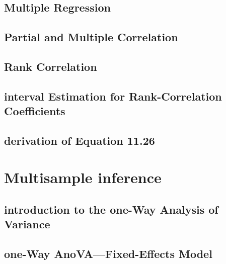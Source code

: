 \documentclass[12pt,]{article}
\begin{document}
\hypertarget{multiple-regression}{%
\subsection{Multiple Regression}\label{multiple-regression}}

\hypertarget{partial-and-multiple-correlation}{%
\subsection{Partial and Multiple
Correlation}\label{partial-and-multiple-correlation}}

\hypertarget{rank-correlation}{%
\subsection{Rank Correlation}\label{rank-correlation}}

\hypertarget{interval-estimation-for-rank-correlation-coefficients}{%
\subsection{interval Estimation for Rank-Correlation
Coefficients}\label{interval-estimation-for-rank-correlation-coefficients}}

\hypertarget{derivation-of-equation-11.26}{%
\subsection{derivation of Equation
11.26}\label{derivation-of-equation-11.26}}

\hypertarget{multisample-inference}{%
\section{Multisample inference}\label{multisample-inference}}

\hypertarget{introduction-to-the-one-way-analysis-of-variance}{%
\subsection{introduction to the one-Way Analysis of
Variance}\label{introduction-to-the-one-way-analysis-of-variance}}

\hypertarget{one-way-anovafixed-effects-model}{%
\subsection{one-Way AnoVA---Fixed-Effects
Model}\label{one-way-anovafixed-effects-model}}
\end{document}
